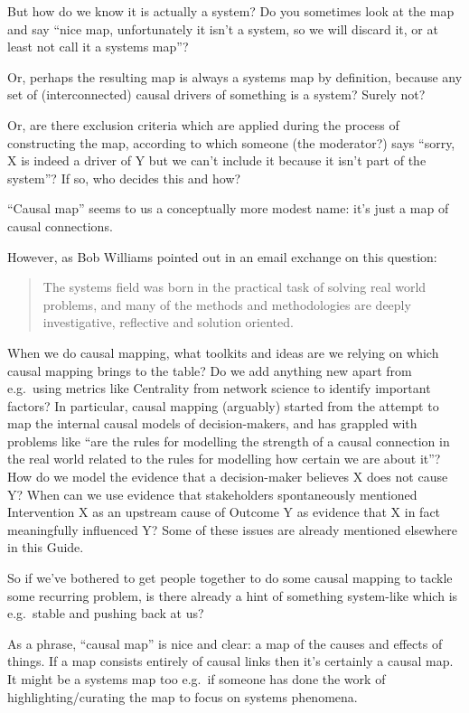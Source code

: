 \documentclass[
]{book}
\begin{document}
But how do we know it is actually a system? Do you sometimes look at the map and say ``nice map, unfortunately it isn't a system, so we will discard it, or at least not call it a systems map''?

Or, perhaps the resulting map is always a systems map by definition, because any set of (interconnected) causal drivers of something is a system? Surely not?

Or, are there exclusion criteria which are applied during the process of constructing the map, according to which someone (the moderator?) says ``sorry, X is indeed a driver of Y but we can't include it because it isn't part of the system''? If so, who decides this and how?

``Causal map'' seems to us a conceptually more modest name: it's just a map of causal connections.

However, as Bob Williams pointed out in an email exchange on this question:

\begin{quote}
The systems field was born in the practical task of solving real world problems, and many of the methods and methodologies are deeply investigative, reflective and solution oriented.
\end{quote}

When we do causal mapping, what toolkits and ideas are we relying on which causal mapping brings to the table? Do we add anything new apart from e.g.~using metrics like Centrality from network science to identify important factors? In particular, causal mapping (arguably) started from the attempt to map the internal causal models of decision-makers, and has grappled with problems like ``are the rules for modelling the strength of a causal connection in the real world related to the rules for modelling how certain we are about it''? How do we model the evidence that a decision-maker believes X does not cause Y? When can we use evidence that stakeholders spontaneously mentioned Intervention X as an upstream cause of Outcome Y as evidence that X in fact meaningfully influenced Y? Some of these issues are already mentioned elsewhere in this Guide.

So if we've bothered to get people together to do some causal mapping to tackle some recurring problem, is there already a hint of something system-like which is e.g.~stable and pushing back at us?

As a phrase, ``causal map'' is nice and clear: a map of the causes and effects of things. If a map consists entirely of causal links then it's certainly a causal map. It might be a systems map too e.g.~if someone has done the work of highlighting/curating the map to focus on systems phenomena.
\end{document}
